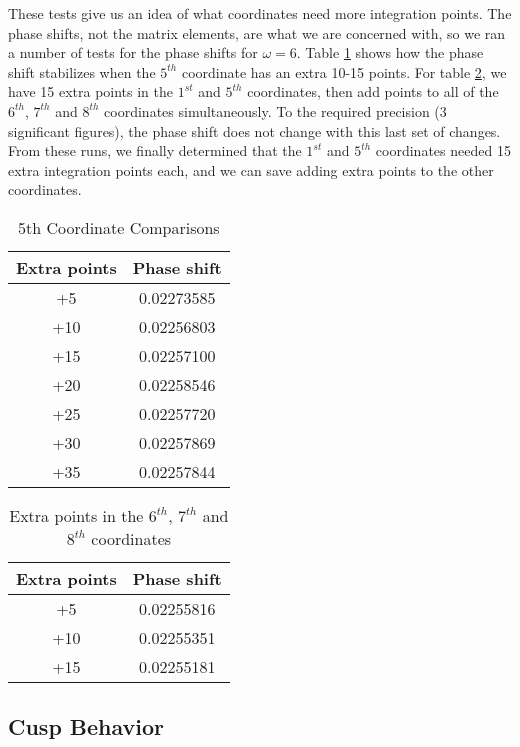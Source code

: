 \documentclass[Dissertation.tex]{subfiles}
\begin{document}
These tests give us an idea of what coordinates need more integration points. The phase shifts, not the matrix elements, are what we are concerned with, so we ran a number of tests for the phase shifts for $\omega = 6$. Table \ref{tab:5thcoordExtraPoints} shows how the phase shift stabilizes when the $5^{th}$ coordinate has an extra 10-15 points. For table \ref{tab:678thcoordExtraPoints}, we have 15 extra points in the $1^{st}$ and $5^{th}$ coordinates, then add points to all of the $6^{th}$, $7^{th}$ and $8^{th}$ coordinates simultaneously. To the required precision (3 significant figures), the phase shift does not change with this last set of changes. From these runs, we finally determined that the $1^{st}$ and $5^{th}$ coordinates needed 15 extra integration points each, and we can save adding extra points to the other coordinates.

\begin{table}[H]
\centering
\begin{tabular}{c c}
\toprule
Extra points & Phase shift \\
\midrule
+5 & 0.02273585 \\
+10 & 0.02256803 \\
+15 & 0.02257100 \\
+20 & 0.02258546 \\
+25 & 0.02257720 \\
+30 & 0.02257869 \\
+35 & 0.02257844 \\
\bottomrule
\end{tabular}
\caption{5th Coordinate Comparisons}
\label{tab:5thcoordExtraPoints}
\end{table}


\begin{table}[H]
\centering
\begin{tabular}{c c}
\toprule
Extra points & Phase shift \\
\midrule
+5 & 0.02255816 \\
+10 & 0.02255351 \\
+15 & 0.02255181 \\
\bottomrule
\end{tabular}
\caption{Extra points in the $6^{th}$, $7^{th}$ and $8^{th}$ coordinates}
\label{tab:678thcoordExtraPoints}
\end{table}



\subsection{Cusp Behavior}
\label{sec:Cusps}
\end{document}
